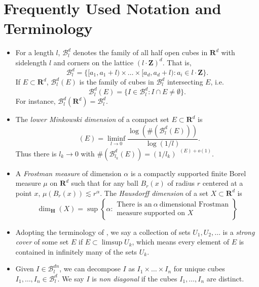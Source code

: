\documentclass[usenames,dvipsnames]{article}
\theoremstyle{plain}
\theoremstyle{plain}
\DeclareMathOperator{\lhdim}{\underline{\dim}_{\mathbf{M}}}
\DeclareMathOperator{\lmbdim}{\underline{\dim}_{\mathbf{MB}}}
\begin{document}
\section{Frequently Used Notation and Terminology}

\begin{itemize}
	\item For a length $l$, $\mathcal{B}^d_l$ denotes the family of all half open cubes in $\mathbf{R}^d$ with sidelength $l$ and corners on the lattice $(l \cdot \mathbf{Z})^d$. That is,
	\[ \mathcal{B}^d_l = \{ [a_1,a_1 + l) \times \dots \times [a_d, a_d + l) : a_i \in l \cdot \mathbf{Z} \}. \]
	If $E \subset \mathbf{R}^d$, $\mathcal{B}^d_l(E)$ is the family of cubes in $\mathcal{B}^d_l$ intersecting $E$, i.e.
	\[\mathcal{B}^d_l(E) = \{ I \in \mathcal{B}^d_l: I \cap E \neq \emptyset \}. \]
	For instance, $\mathcal{B}^d_l(\mathbf{R}^d) = \mathcal{B}^d_l$.

	\item The {\it lower Minkowski dimension} of a compact set $E \subset \mathbf{R}^d$ is
	\[ \lhdim(E) = \liminf_{l \to 0} \frac{\log( \#( \mathcal{B}^d_l(E) ) )}{\log(1/l)}. \]
	Thus there is $l_k \to 0$ with $\# ( \mathcal{B}^d_{l_k}(E) ) = (1/l_k)^{\lhdim(E) + o(1)}$.

	\item A {\it Frostman measure} of dimension $\alpha$ is a compactly supported finite Borel measure $\mu$ on $\mathbf{R}^d$ such that for any ball $B_r(x)$ of radius $r$ centered at a point $x$, $\mu(B_r(x)) \lesssim r^\alpha$. The {\it Hausdorff dimension} of a set $X \subset \mathbf{R}^d$ is
	\[ \dim_{\mathbf{H}}(X) = \sup \left\{ \alpha: \begin{array}{c} \text{There is an}\ \alpha\ \text{dimensional Frostman}\\
	\text{measure supported on $X$} \end{array} \right\} \]



	\item Adopting the terminology of \cite{KatzTao}, we say a collection of sets $U_1, U_2, \dots$ is a {\it strong cover} of some set $E$ if $E \subset \limsup U_k$, which means every element of $E$ is contained in infinitely many of the sets $U_k$.

	\item Given $I \in \mathcal{B}^{dn}_l$, we can decompose $I$ as $I_1 \times \dots \times I_n$ for unique cubes $I_1, \dots, I_n \in \mathcal{B}^d_l$. We say $I$ is {\it non diagonal} if the cubes $I_1, \dots, I_n$ are distinct.

\end{itemize}
\end{document}
